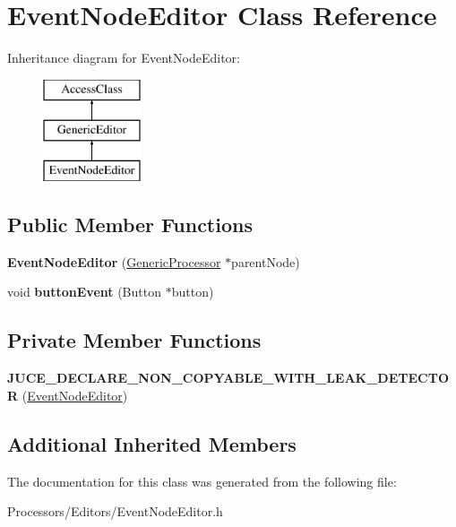\hypertarget{classEventNodeEditor}{\section{Event\-Node\-Editor Class Reference}
\label{classEventNodeEditor}
}
Inheritance diagram for Event\-Node\-Editor\-:\begin{figure}[H]
\begin{center}
\leavevmode
\includegraphics[height=3.000000cm]{classEventNodeEditor}
\end{center}
\end{figure}
\subsection*{Public Member Functions}
\begin{DoxyCompactItemize}
\item 
\hypertarget{classEventNodeEditor_afc10c0210f8f2d53842723ce9d0cb477}{{\bfseries Event\-Node\-Editor} (\hyperlink{classGenericProcessor}{Generic\-Processor} $\ast$parent\-Node)}\label{classEventNodeEditor_afc10c0210f8f2d53842723ce9d0cb477}

\item 
\hypertarget{classEventNodeEditor_a4eef393b8734628eb5b9e4828cf3180e}{void {\bfseries button\-Event} (Button $\ast$button)}\label{classEventNodeEditor_a4eef393b8734628eb5b9e4828cf3180e}

\end{DoxyCompactItemize}
\subsection*{Private Member Functions}
\begin{DoxyCompactItemize}
\item 
\hypertarget{classEventNodeEditor_ae83c947301c0ce834ab1a1acf99c2856}{{\bfseries J\-U\-C\-E\-\_\-\-D\-E\-C\-L\-A\-R\-E\-\_\-\-N\-O\-N\-\_\-\-C\-O\-P\-Y\-A\-B\-L\-E\-\_\-\-W\-I\-T\-H\-\_\-\-L\-E\-A\-K\-\_\-\-D\-E\-T\-E\-C\-T\-O\-R} (\hyperlink{classEventNodeEditor}{Event\-Node\-Editor})}\label{classEventNodeEditor_ae83c947301c0ce834ab1a1acf99c2856}

\end{DoxyCompactItemize}
\subsection*{Additional Inherited Members}


The documentation for this class was generated from the following file\-:\begin{DoxyCompactItemize}
\item 
Processors/\-Editors/Event\-Node\-Editor.\-h\end{DoxyCompactItemize}

